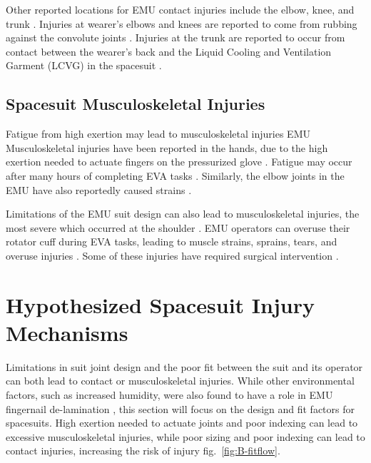 \documentclass[defaultstyle,11pt]{thesis}
\begin{document}
Other reported locations for EMU contact injuries include the elbow, knee, and trunk \citep{Strauss2004, Scheuring2012}.
Injuries at wearer's elbows and knees are reported to come from rubbing against the convolute joints \citep{Strauss2004}.
Injuries at the trunk are reported to occur from contact between the wearer's back and the Liquid Cooling and Ventilation Garment (LCVG) in the spacesuit \citep{Strauss2004}.

\hypertarget{spacesuit-musculoskeletal-injuries}{%
\subsection{Spacesuit Musculoskeletal Injuries}\label{spacesuit-musculoskeletal-injuries}}

Fatigue from high exertion may lead to musculoskeletal injuries
EMU Musculoskeletal injuries have been reported in the hands, due to the high exertion needed to actuate fingers on the pressurized glove \citep{Viegas2004}.
Fatigue may occur after many hours of completing EVA tasks \citep{Strauss2004, Scheuring2012}.
Similarly, the elbow joints in the EMU have also reportedly caused strains \citep{Strauss2004}.

Limitations of the EMU suit design can also lead to musculoskeletal injuries, the most severe which occurred at the shoulder \citep{Strauss2004}.
EMU operators can overuse their rotator cuff during EVA tasks, leading to muscle strains, sprains, tears, and overuse injuries \citep{Williams2003, Strauss2004, Strauss2005, Scheuring2012}.
Some of these injuries have required surgical intervention \citep{Strauss2005}.

\hypertarget{hypothesized-spacesuit-injury-mechanisms}{%
\section{Hypothesized Spacesuit Injury Mechanisms}\label{hypothesized-spacesuit-injury-mechanisms}}

Limitations in suit joint design and the poor fit between the suit and its operator can both lead to contact or musculoskeletal injuries.
While other environmental factors, such as increased humidity, were also found to have a role in EMU fingernail de-lamination \citep{Chappell2017}, this section will focus on the design and fit factors for spacesuits.
High exertion needed to actuate joints and poor indexing can lead to excessive musculoskeletal injuries, while poor sizing and poor indexing can lead to contact injuries, increasing the risk of injury fig.~\ref{fig:B-fitflow}.
\end{document}
